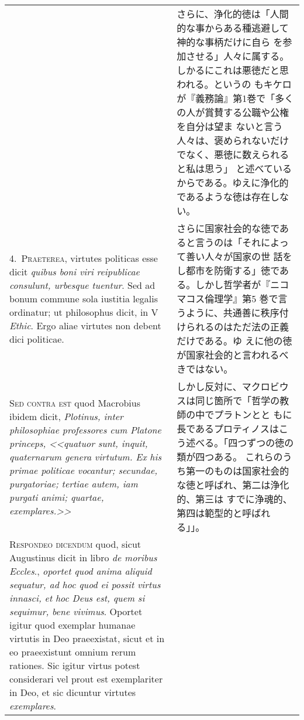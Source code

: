 \documentclass[10pt]{jsarticle}
\begin{document}
\begin{longtable}{p{21em}p{21em}}
&

 さらに、浄化的徳は「人間的な事からある種逃避して神的な事柄だけに自ら
 を参加させる」人々に属する。しかるにこれは悪徳だと思われる。というの
 もキケロが『義務論』第1巻で「多くの人が賞賛する公職や公権を自分は望ま
 ないと言う人々は、褒められないだけでなく、悪徳に数えられると私は思う」
 と述べているからである。ゆえに浄化的であるような徳は存在しない。

 
\\



4.~{\scshape Praeterea}, virtutes politicas esse dicit {\itshape
quibus boni viri reipublicae consulunt, urbesque tuentur}. Sed ad
bonum commune sola iustitia legalis ordinatur; ut philosophus dicit,
in V {\itshape Ethic}. Ergo aliae virtutes non debent dici politicae.

&

 さらに国家社会的な徳であると言うのは「それによって善い人々が国家の世
 話をし都市を防衛する」徳である。しかし哲学者が『ニコマコス倫理学』第5
 巻で言うように、共通善に秩序付けられるのはただ法の正義だけである。ゆ
 えに他の徳が国家社会的と言われるべきではない。

 
\\



{\scshape Sed contra est} quod Macrobius ibidem dicit, {\itshape
Plotinus, inter philosophiae professores cum Platone princeps, <<quatuor
sunt, inquit, quaternarum genera virtutum. Ex his primae politicae
vocantur; secundae, purgatoriae; tertiae autem, iam purgati animi;
quartae, exemplares.>>}


&

 しかし反対に、マクロビウスは同じ箇所で「哲学の教師の中でプラトンとと
 もに長であるプロティノスはこう述べる。「四つずつの徳の類が四つある。
 これらのうち第一のものは国家社会的な徳と呼ばれ、第二は浄化的、第三は
 すでに浄魂的、第四は範型的と呼ばれる」」。
 
\\



 {\scshape Respondeo dicendum} quod, sicut Augustinus dicit in libro
 {\itshape de moribus Eccles}., {\itshape oportet quod anima aliquid
 sequatur, ad hoc quod ei possit virtus innasci, et hoc Deus est, quem
 si sequimur, bene vivimus}. Oportet igitur quod exemplar humanae
 virtutis in Deo praeexistat, sicut et in eo praeexistunt omnium rerum
 rationes. Sic igitur virtus potest considerari vel prout est
 exemplariter in Deo, et sic dicuntur virtutes {\itshape exemplares}.



\end{longtable}
\end{document}

